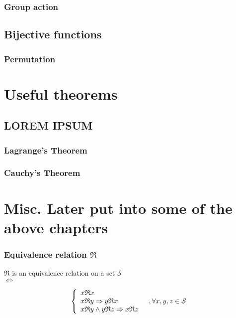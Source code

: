 \documentclass[a4paper,11pt]{kth-mag}
\newcommand{\REL}{\ensuremath{\mathfrak{R}}}
\renewcommand{\SS}{\ensuremath{\mathcal{S}}}
\begin{document}
\subsection{Group action}
\label{sec:groupaction}


\section{Bijective functions}
\subsection{Permutation}

\chapter{Useful theorems}

\section{LOREM IPSUM}
\subsection{Lagrange's Theorem}
\subsection{Cauchy's Theorem}


\chapter{Misc. Later put into some of the above chapters}

\subsection{Equivalence relation \REL}
\begin{center}
$\REL$ is an equivalence relation on a set $\SS$ \\
$\Leftrightarrow$
\end{center}

\begin{equation}\left\{
    \begin{array}{l l}
        x \REL x & \\
        x \REL y \Rightarrow y \REL x & \\
        x \REL y \wedge y \REL z \Rightarrow x \REL z & 
    \end{array} , \forall x,y,z \in \SS
\right.\end{equation}
\end{document}
